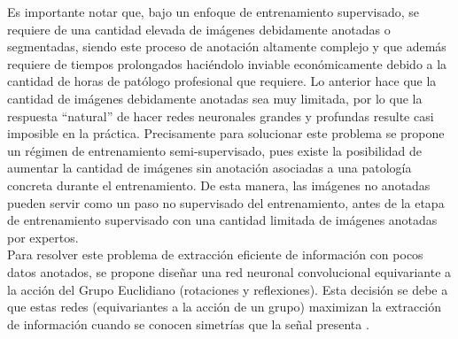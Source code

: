 \documentclass[12pt,letterpaper,final, openany]{scrbook}
\begin{document}
Es importante notar que, bajo un enfoque de entrenamiento supervisado, se requiere de una cantidad elevada de imágenes debidamente anotadas o segmentadas, siendo este proceso de anotación  altamente complejo y que además requiere de tiempos prolongados haciéndolo inviable económicamente debido a la cantidad de horas de patólogo profesional que requiere. Lo anterior hace que la cantidad de imágenes debidamente anotadas sea muy limitada, por lo que la respuesta “natural” de hacer redes neuronales grandes y profundas resulte casi imposible en la práctica. Precisamente para solucionar este problema se propone un régimen de entrenamiento semi-supervisado, pues existe la posibilidad de aumentar la cantidad de imágenes sin anotación asociadas a una patología concreta durante el entrenamiento. De esta manera, las imágenes no anotadas pueden servir como un paso no supervisado del entrenamiento, antes de la etapa de entrenamiento supervisado con una cantidad limitada de imágenes anotadas por expertos.
\\
Para resolver este problema de extracción eficiente de información con pocos datos anotados, se propone diseñar una red neuronal convolucional equivariante a la acción del Grupo Euclidiano (rotaciones y reflexiones). Esta decisión se debe a que estas redes (equivariantes a la acción de un grupo) maximizan la extracción de información cuando se conocen simetrías que la señal presenta \cite{elesedy_provably_2021}. %
\end{document}
